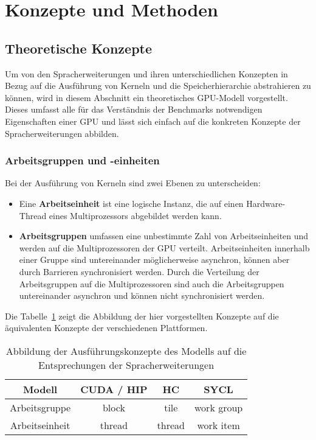 \section{Konzepte und Methoden}
\label{methoden}

\subsection{Theoretische Konzepte}
\label{methoden:konzepte}

Um von den Spracherweiterungen und ihren unterschiedlichen Konzepten in Bezug
auf die Ausführung von Kerneln und die Speicherhierarchie abstrahieren zu
können, wird in diesem Abschnitt ein theoretisches GPU-Modell vorgestellt.
Dieses umfasst alle für das Verständnis der Benchmarks notwendigen Eigenschaften
einer GPU und lässt sich einfach auf die konkreten Konzepte der
Spracherweiterungen abbilden.

\subsubsection{Arbeitsgruppen und -einheiten}

Bei der Ausführung von Kerneln sind zwei Ebenen zu unterscheiden:

\begin{itemize}
    \item Eine \textbf{Arbeitseinheit} ist eine logische Instanz, die auf einen
          Hardware-Thread eines Multiprozessors abgebildet werden kann.
    \item \textbf{Arbeitsgruppen} umfassen eine unbestimmte Zahl von
          Arbeitseinheiten und werden auf die Multiprozessoren der GPU verteilt.
          Arbeitseinheiten innerhalb einer Gruppe sind untereinander
          möglicherweise asynchron, können aber durch Barrieren synchronisiert
          werden. Durch die Verteilung der Arbeitsgruppen auf die
          Multiprozessoren sind auch die Arbeitsgruppen untereinander asynchron
          und können nicht synchronisiert werden.
\end{itemize}

Die Tabelle~\ref{methoden:konzepte:arbeit:tabelle} zeigt die Abbildung der
hier vorgestellten Konzepte auf die äquivalenten Konzepte der verschiedenen
Plattformen.

\begin{table}[htb]
    \centering
    \begin{tabular}{|c|c|c|c|}
        \hline
        Modell & CUDA / HIP & HC & SYCL\\ \hline
        Arbeitsgruppe & block & tile & work group\\ \hline
        Arbeitseinheit & thread & thread & work item\\ \hline
    \end{tabular}
    \caption{Abbildung der Ausführungskonzepte des Modells auf die
             Entsprechungen der Spracherweiterungen}
    \label{methoden:konzepte:arbeit:tabelle}
\end{table}

